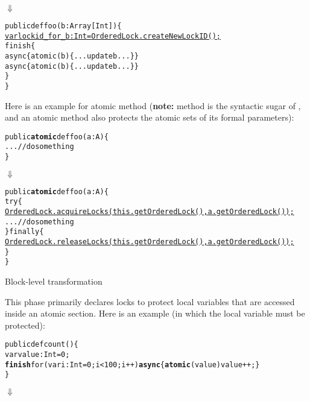 \documentclass{article}
\begin{document}
\begin{enumerate}
\begin{itemize}
\hspace{10mm}$\Downarrow$

\begin{CodeOut}
\begin{alltt}
public def foo(b:Array[Int]) \{
    \underline{var lockid\_for\_b:Int = OrderedLock.createNewLockID();}
    finish \{
       async \{atomic(b) \{...update b... \}\}
       async \{atomic(b) \{...update b... \}\}
    \}
\}
\end{alltt}
\end{CodeOut}
\end{itemize}

Here is an example for atomic method (\textbf{note:}  method is the syntactic sugar of , and an atomic method also protects the atomic sets of its formal parameters):

\begin{CodeOut}
\begin{alltt}
public \textbf{atomic} def foo(a:A) \{
    ...//do something
\}
\end{alltt}
\end{CodeOut}

\hspace{10mm}$\Downarrow$

\begin{CodeOut}
\begin{alltt}
public \textbf{atomic} def foo(a:A) \{
  try\{
    \underline{OrderedLock.acquireLocks(this.getOrderedLock(), a.getOrderedLock());}
    ...//do something
  \} finally \{
    \underline{OrderedLock.releaseLocks(this.getOrderedLock(), a.getOrderedLock());}
  \}
\}
\end{alltt}
\end{CodeOut}

\Item Block-level transformation

This phase primarily declares locks to protect local variables that are accessed inside an atomic section. Here is an example (in which the local variable  must be protected):

\begin{CodeOut}
\begin{alltt}
public def count() \{
    var value:Int = 0;
    \textbf{finish} for (var i:Int = 0; i < 100; i++) \textbf{async} \{ \textbf{atomic}(value) value ++; \}
\}
\end{alltt}
\end{CodeOut}

\hspace{10mm}$\Downarrow$


\end{enumerate}
\end{document}
